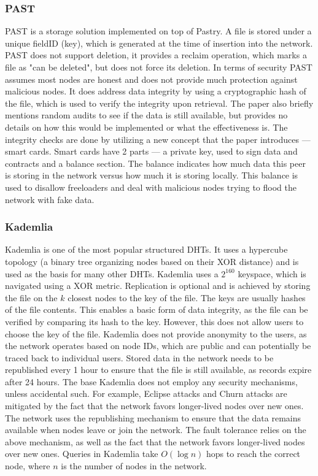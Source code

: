 \subsubsection{PAST}

PAST \cite{past} is a storage solution implemented on top of Pastry.
A file is stored under a unique fieldID (key),
which is generated at the time of insertion into the network.
PAST does not support deletion, it provides a reclaim operation, which marks a file as
"can be deleted", but does not force its deletion.
In terms of security PAST assumes most nodes are honest and does not provide much protection against
malicious nodes.
It does address data integrity by using a cryptographic hash of the file,
which is used to verify the integrity upon retrieval.
The paper also briefly mentions random audits to see if the data is still available,
but provides no details on how this would be implemented or what the effectiveness is.
The integrity checks are done by utilizing a new concept that the paper introduces --- smart cards.
Smart cards have 2 parts --- a private key, used to sign data and contracts and a balance section.
The balance indicates how much data this peer is storing in the network versus how much it is storing locally.
This balance is used to disallow freeloaders and deal with malicious nodes trying to flood the
network with fake data.

\subsubsection{Kademlia}

Kademlia \cite{kademlia} is one of the most popular structured DHTs.
It uses a hypercube topology (a binary tree organizing nodes based on their XOR distance)
and is used as the basis for many other DHTs.
Kademlia uses a $2^{160}$ keyspace, which is navigated using a XOR metric.
Replication is optional and is achieved by storing the file on the $k$ closest nodes to the key of the file.
The keys are usually hashes of the file contents.
This enables a basic form of data integrity, as the file can be verified by comparing its hash to the key.
However, this does not allow users to choose the key of the file.
Kademlia does not provide anonymity to the users, as the network operates based on node IDs,
which are public and can potentially be traced back to individual users.
Stored data in the network needs to be republished every 1 hour to ensure that the file is still available,
as records expire after 24 hours.
The base Kademlia does not employ any security mechanisms, unless accidental such.
For example, Eclipse attacks and Churn attacks are mitigated by
the fact that the network favors longer-lived nodes over new ones.
The network uses the republishing mechanism to ensure that the data remains available when nodes
leave or join the network.
The fault tolerance relies on the above mechanism,
as well as the fact that the network favors longer-lived nodes over new ones.
Queries in Kademlia take $O(\log n)$ hops to reach the correct node, where $n$ is the number of nodes in the network.

